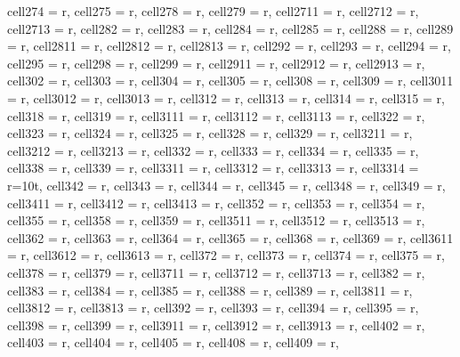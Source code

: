 \begin{landscape}
\begin{longtblr}[
  caption = {Changes in average values and effects differences significance from post hoc analysis.},
  label = {tab:appendix_LCBM_all_results_post_hocs}
]
{  cell{27}{4} = {r},
  cell{27}{5} = {r},
  cell{27}{8} = {r},
  cell{27}{9} = {r},
  cell{27}{11} = {r},
  cell{27}{12} = {r},
  cell{27}{13} = {r},
  cell{28}{2} = {r},
  cell{28}{3} = {r},
  cell{28}{4} = {r},
  cell{28}{5} = {r},
  cell{28}{8} = {r},
  cell{28}{9} = {r},
  cell{28}{11} = {r},
  cell{28}{12} = {r},
  cell{28}{13} = {r},
  cell{29}{2} = {r},
  cell{29}{3} = {r},
  cell{29}{4} = {r},
  cell{29}{5} = {r},
  cell{29}{8} = {r},
  cell{29}{9} = {r},
  cell{29}{11} = {r},
  cell{29}{12} = {r},
  cell{29}{13} = {r},
  cell{30}{2} = {r},
  cell{30}{3} = {r},
  cell{30}{4} = {r},
  cell{30}{5} = {r},
  cell{30}{8} = {r},
  cell{30}{9} = {r},
  cell{30}{11} = {r},
  cell{30}{12} = {r},
  cell{30}{13} = {r},
  cell{31}{2} = {r},
  cell{31}{3} = {r},
  cell{31}{4} = {r},
  cell{31}{5} = {r},
  cell{31}{8} = {r},
  cell{31}{9} = {r},
  cell{31}{11} = {r},
  cell{31}{12} = {r},
  cell{31}{13} = {r},
  cell{32}{2} = {r},
  cell{32}{3} = {r},
  cell{32}{4} = {r},
  cell{32}{5} = {r},
  cell{32}{8} = {r},
  cell{32}{9} = {r},
  cell{32}{11} = {r},
  cell{32}{12} = {r},
  cell{32}{13} = {r},
  cell{33}{2} = {r},
  cell{33}{3} = {r},
  cell{33}{4} = {r},
  cell{33}{5} = {r},
  cell{33}{8} = {r},
  cell{33}{9} = {r},
  cell{33}{11} = {r},
  cell{33}{12} = {r},
  cell{33}{13} = {r},
  cell{33}{14} = {r=10}{t},
  cell{34}{2} = {r},
  cell{34}{3} = {r},
  cell{34}{4} = {r},
  cell{34}{5} = {r},
  cell{34}{8} = {r},
  cell{34}{9} = {r},
  cell{34}{11} = {r},
  cell{34}{12} = {r},
  cell{34}{13} = {r},
  cell{35}{2} = {r},
  cell{35}{3} = {r},
  cell{35}{4} = {r},
  cell{35}{5} = {r},
  cell{35}{8} = {r},
  cell{35}{9} = {r},
  cell{35}{11} = {r},
  cell{35}{12} = {r},
  cell{35}{13} = {r},
  cell{36}{2} = {r},
  cell{36}{3} = {r},
  cell{36}{4} = {r},
  cell{36}{5} = {r},
  cell{36}{8} = {r},
  cell{36}{9} = {r},
  cell{36}{11} = {r},
  cell{36}{12} = {r},
  cell{36}{13} = {r},
  cell{37}{2} = {r},
  cell{37}{3} = {r},
  cell{37}{4} = {r},
  cell{37}{5} = {r},
  cell{37}{8} = {r},
  cell{37}{9} = {r},
  cell{37}{11} = {r},
  cell{37}{12} = {r},
  cell{37}{13} = {r},
  cell{38}{2} = {r},
  cell{38}{3} = {r},
  cell{38}{4} = {r},
  cell{38}{5} = {r},
  cell{38}{8} = {r},
  cell{38}{9} = {r},
  cell{38}{11} = {r},
  cell{38}{12} = {r},
  cell{38}{13} = {r},
  cell{39}{2} = {r},
  cell{39}{3} = {r},
  cell{39}{4} = {r},
  cell{39}{5} = {r},
  cell{39}{8} = {r},
  cell{39}{9} = {r},
  cell{39}{11} = {r},
  cell{39}{12} = {r},
  cell{39}{13} = {r},
  cell{40}{2} = {r},
  cell{40}{3} = {r},
  cell{40}{4} = {r},
  cell{40}{5} = {r},
  cell{40}{8} = {r},
  cell{40}{9} = {r},
}
\end{longtblr}
\end{landscape}
